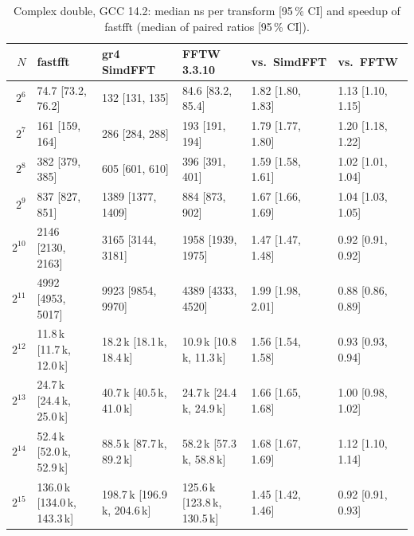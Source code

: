 \begin{table}[h]\centering
\caption{Complex double, GCC 14.2: median ns per transform [95\,\% CI] and speedup of fastfft (median of paired ratios [95\,\% CI]).}\label{tab:double}
\begin{tabular}{rlllll}\toprule
$N$ & fastfft & gr4 SimdFFT & FFTW 3.3.10 & vs.\ SimdFFT & vs.\ FFTW\\\midrule
$2^{6}$ & 74.7 {\scriptsize[73.2, 76.2]} & 132 {\scriptsize[131, 135]} & 84.6 {\scriptsize[83.2, 85.4]} & 1.82 {\scriptsize[1.80, 1.83]} & 1.13 {\scriptsize[1.10, 1.15]}\\
$2^{7}$ & 161 {\scriptsize[159, 164]} & 286 {\scriptsize[284, 288]} & 193 {\scriptsize[191, 194]} & 1.79 {\scriptsize[1.77, 1.80]} & 1.20 {\scriptsize[1.18, 1.22]}\\
$2^{8}$ & 382 {\scriptsize[379, 385]} & 605 {\scriptsize[601, 610]} & 396 {\scriptsize[391, 401]} & 1.59 {\scriptsize[1.58, 1.61]} & 1.02 {\scriptsize[1.01, 1.04]}\\
$2^{9}$ & 837 {\scriptsize[827, 851]} & 1389 {\scriptsize[1377, 1409]} & 884 {\scriptsize[873, 902]} & 1.67 {\scriptsize[1.66, 1.69]} & 1.04 {\scriptsize[1.03, 1.05]}\\
$2^{10}$ & 2146 {\scriptsize[2130, 2163]} & 3165 {\scriptsize[3144, 3181]} & 1958 {\scriptsize[1939, 1975]} & 1.47 {\scriptsize[1.47, 1.48]} & 0.92 {\scriptsize[0.91, 0.92]}\\
$2^{11}$ & 4992 {\scriptsize[4953, 5017]} & 9923 {\scriptsize[9854, 9970]} & 4389 {\scriptsize[4333, 4520]} & 1.99 {\scriptsize[1.98, 2.01]} & 0.88 {\scriptsize[0.86, 0.89]}\\
$2^{12}$ & 11.8\,k {\scriptsize[11.7\,k, 12.0\,k]} & 18.2\,k {\scriptsize[18.1\,k, 18.4\,k]} & 10.9\,k {\scriptsize[10.8\,k, 11.3\,k]} & 1.56 {\scriptsize[1.54, 1.58]} & 0.93 {\scriptsize[0.93, 0.94]}\\
$2^{13}$ & 24.7\,k {\scriptsize[24.4\,k, 25.0\,k]} & 40.7\,k {\scriptsize[40.5\,k, 41.0\,k]} & 24.7\,k {\scriptsize[24.4\,k, 24.9\,k]} & 1.66 {\scriptsize[1.65, 1.68]} & 1.00 {\scriptsize[0.98, 1.02]}\\
$2^{14}$ & 52.4\,k {\scriptsize[52.0\,k, 52.9\,k]} & 88.5\,k {\scriptsize[87.7\,k, 89.2\,k]} & 58.2\,k {\scriptsize[57.3\,k, 58.8\,k]} & 1.68 {\scriptsize[1.67, 1.69]} & 1.12 {\scriptsize[1.10, 1.14]}\\
$2^{15}$ & 136.0\,k {\scriptsize[134.0\,k, 143.3\,k]} & 198.7\,k {\scriptsize[196.9\,k, 204.6\,k]} & 125.6\,k {\scriptsize[123.8\,k, 130.5\,k]} & 1.45 {\scriptsize[1.42, 1.46]} & 0.92 {\scriptsize[0.91, 0.93]}\\

\end{tabular}
\end{table}
